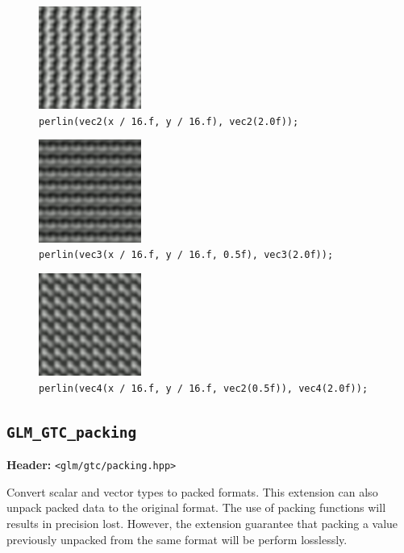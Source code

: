 \documentclass{scrartcl}
\numberwithin{figure}{subsection}
\begin{document}
\begin{figure}
  \centering
  \includegraphics[width=0.3\textwidth]{perlin4}
  \cprotect\caption{\verb|perlin(vec2(x / 16.f, y / 16.f), vec2(2.0f));|}
\end{figure}

\begin{figure}
  \centering
  \includegraphics[width=0.3\textwidth]{perlin5}
  \cprotect\caption{\verb|perlin(vec3(x / 16.f, y / 16.f, 0.5f), vec3(2.0f));|}
\end{figure}

\begin{figure}
  \centering
  \includegraphics[width=0.3\textwidth]{perlin6}
  \cprotect\caption{\verb|perlin(vec4(x / 16.f, y / 16.f, vec2(0.5f)), vec4(2.0f));|}
\end{figure}

\subsection{\texttt{GLM\_GTC\_packing}}
\textbf{Header:} \verb|<glm/gtc/packing.hpp>|

Convert scalar and vector types to packed formats. This extension can also unpack packed data to the original format. The use of packing functions will results in precision lost. However, the extension guarantee that packing a value previously unpacked from the same format will be perform losslessly.
\end{document}

